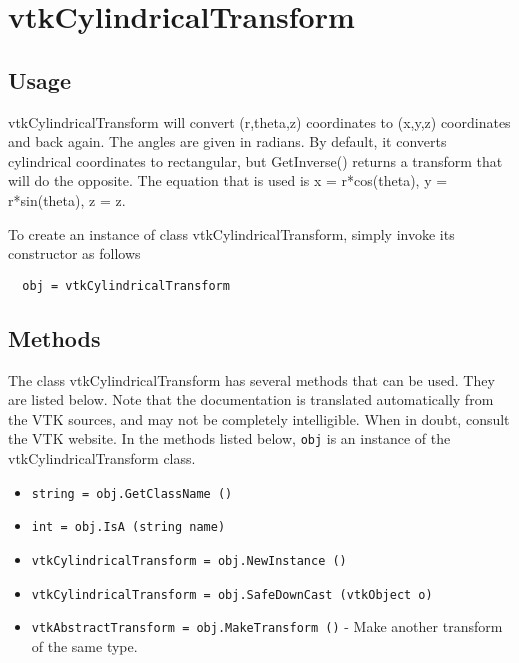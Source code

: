 \section{vtkCylindricalTransform}

\subsection{Usage}

 vtkCylindricalTransform will convert (r,theta,z) coordinates to 
 (x,y,z) coordinates and back again.  The angles are given in radians.
 By default, it converts cylindrical coordinates to rectangular, but
 GetInverse() returns a transform that will do the opposite.  The
 equation that is used is x = r*cos(theta), y = r*sin(theta), z = z.

To create an instance of class vtkCylindricalTransform, simply
invoke its constructor as follows
\begin{verbatim}
  obj = vtkCylindricalTransform
\end{verbatim}
\subsection{Methods}

The class vtkCylindricalTransform has several methods that can be used.
  They are listed below.
Note that the documentation is translated automatically from the VTK sources,
and may not be completely intelligible.  When in doubt, consult the VTK website.
In the methods listed below, \verb|obj| is an instance of the vtkCylindricalTransform class.
\begin{itemize}
\item  \verb|string = obj.GetClassName ()|

\item  \verb|int = obj.IsA (string name)|

\item  \verb|vtkCylindricalTransform = obj.NewInstance ()|

\item  \verb|vtkCylindricalTransform = obj.SafeDownCast (vtkObject o)|

\item  \verb|vtkAbstractTransform = obj.MakeTransform ()| -  Make another transform of the same type.

\end{itemize}

